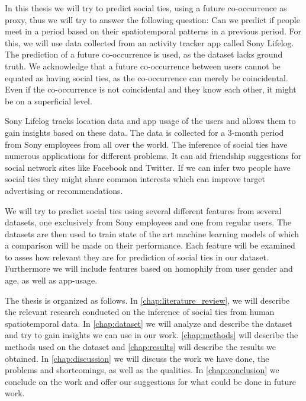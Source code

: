 In this thesis we will try to predict social ties, using a future co-occurrence as proxy, thus we will try to answer the following question: Can we predict if people meet in a period based on their spatiotemporal patterns in a previous period. For this, we will use data collected from an activity tracker app called Sony Lifelog\cite{sonyLifeLog}. The prediction of a future co-occurrence is used, as the dataset lacks ground truth. We acknowledge that a future co-occurrence between users cannot be equated as having social ties, as the co-occurrence can merely be coincidental. Even if the co-occurrence is not coincidental and they know each other, it might be on a superficial level.

Sony Lifelog tracks location data and app usage of the users and allows them to gain insights based on these data. The data is collected for a 3-month period from Sony employees from all over the world.
The inference of social ties have numerous applications for different problems. It can aid friendship suggestions for social network sites like Facebook and Twitter. If we can infer two people have social ties they might share common interests which can improve target advertising or recommendations\cite{yu2015investigating}.

We will try to predict social ties using several different features from several datasets, one exclusively from Sony employees and one from regular users. The datasets are then used to train state of the art machine learning models of which a comparison will be made on their performance. Each feature will be examined to asses how relevant they are for prediction of social ties in our dataset. Furthermore we will include features based on homophily\cite{mcpherson2001birds} from user gender and age, as well as app-usage.

The thesis is organized as follows. In \autoref{chap:literature_review}, we will describe the relevant research conducted on the inference of social ties from human spatiotemporal data. In \autoref{chap:dataset} we will analyze and describe the dataset and try to gain insights we can use in our work. \autoref{chap:methods} will describe the methods used on the dataset and \autoref{chap:results} will describe the results we obtained. In \autoref{chap:discussion} we will discuss the work we have done, the problems and shortcomings, as well as the qualities. In \autoref{chap:conclusion} we conclude on the work and offer our suggestions for what could be done in future work.


